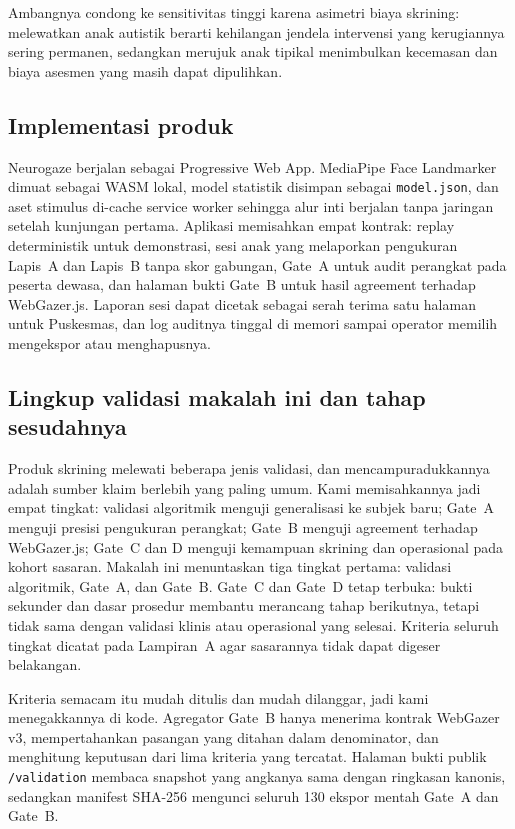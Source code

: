 \documentclass{article}
\begin{document}
Ambangnya condong ke sensitivitas tinggi karena asimetri biaya skrining: melewatkan anak
autistik berarti kehilangan jendela intervensi yang kerugiannya sering permanen, sedangkan
merujuk anak tipikal menimbulkan kecemasan dan biaya asesmen yang masih dapat dipulihkan.

\subsection{Implementasi produk}

Neurogaze berjalan sebagai Progressive Web App. MediaPipe Face Landmarker dimuat sebagai WASM
lokal, model statistik disimpan sebagai \texttt{model.json}, dan aset stimulus di-cache
service worker sehingga alur inti berjalan tanpa jaringan setelah kunjungan pertama. Aplikasi
memisahkan empat kontrak: replay deterministik untuk demonstrasi, sesi anak yang melaporkan
pengukuran Lapis~A dan Lapis~B tanpa skor gabungan, Gate~A untuk audit perangkat pada peserta
dewasa, dan halaman bukti Gate~B untuk hasil agreement terhadap WebGazer.js. Laporan sesi
dapat dicetak sebagai serah terima satu halaman untuk Puskesmas, dan log auditnya tinggal di
memori sampai operator memilih mengekspor atau menghapusnya.

\subsection{Lingkup validasi makalah ini dan tahap sesudahnya}
\label{sec:gate}

Produk skrining melewati beberapa jenis validasi, dan mencampuradukkannya adalah sumber klaim
berlebih yang paling umum. Kami memisahkannya jadi empat tingkat: validasi algoritmik menguji
generalisasi ke subjek baru; Gate~A menguji presisi pengukuran perangkat; Gate~B menguji
agreement terhadap WebGazer.js; Gate~C dan D menguji kemampuan skrining dan
operasional pada kohort sasaran. Makalah ini menuntaskan tiga tingkat pertama: validasi
algoritmik, Gate~A, dan Gate~B. Gate~C dan Gate~D tetap terbuka: bukti sekunder dan dasar
prosedur membantu merancang tahap berikutnya, tetapi tidak sama dengan validasi klinis atau
operasional yang selesai. Kriteria seluruh tingkat dicatat pada Lampiran~A agar
sasarannya tidak dapat digeser belakangan.

Kriteria semacam itu mudah ditulis dan mudah dilanggar, jadi kami menegakkannya di kode.
Agregator Gate~B hanya menerima kontrak WebGazer v3, mempertahankan pasangan yang ditahan
dalam denominator, dan menghitung keputusan dari lima kriteria yang tercatat. Halaman bukti
publik \texttt{/validation} membaca snapshot yang angkanya sama dengan ringkasan kanonis,
sedangkan manifest SHA-256 mengunci seluruh 130 ekspor mentah Gate~A dan Gate~B.
\end{document}
